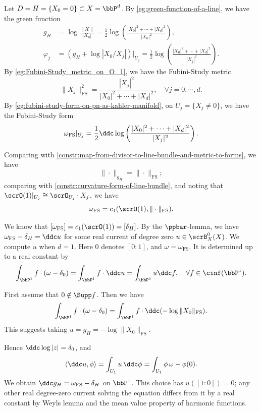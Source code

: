 \begin{example}[label=\labelNFM{eg:green-divisor-and-forms-of-line-in-pn}, status=draft, tag=0000000]
  Let $D = H = \{X_0 = 0\} \subset X = \bbP^d$.
  By \cref{eg:green-function-of-a-line}, we have the green function
  \begin{align*}
    g_H & = \log \frac{\|X\|}{|X_0|} = \frac{1}{2} \log \left( \frac{|X_0|^2 + \cdots + |X_d|^2}{|X_0|^2} \right), \\
    \varphi_j & = (g_H + \log |X_0/X_j|)|_{U_j} = \frac{1}{2} \log \left( \frac{|X_0|^2 + \cdots + |X_d|^2}{|X_j|^2} \right).
  \end{align*}
  By \cref{eg:Fubini-Study_metric_on_O_1}, we have the Fubini-Study metric
  \[ \|X_j\|_{\mathrm{FS}}^2 = \frac{|X_j|^2}{|X_0|^2 + \cdots + |X_d|^2}, \quad \forall j = 0,\cdots,d. \]
  By \cref{eg:fubini-study-form-on-pn-as-kahler-manifold}, on $U_j = \{X_j \neq 0\}$,
  we have the Fubini-Study form
  \[ \omega_{\mathrm{FS}}|_{U_j} = \frac{1}{2} \ddc \log \left(\frac{|X_0|^2 + \cdots + |X_d|^2}{|X_j|^2} \right). \]

  Comparing with \cref{constr:map-from-divisor-to-line-bundle-and-metric-to-forms}, we have
  \[ \|\cdot\|_{g_H} = \|\cdot\|_{\mathrm{FS}}; \]
  comparing with \cref{constr:curvature-form-of-line-bundle},
  and noting that $\scrO(1)|_{U_j} \cong \scrO_{U_j} \cdot X_j$, we have
  \[ \omega_{\mathrm{FS}} = c_1(\scrO(1), \|\cdot\|_{\mathrm{FS}}). \]

  We know that $[\omega_{\mathrm{FS}}] = c_1(\scrO(1)) = [\delta_H]$.
  By the $\ppbar$-lemma, we have $\omega_{\mathrm{FS}} - \delta_H = \ddc u$ for some real current of degree zero $u \in \scrB_X^0(X)$.
  We compute $u$ when $d = 1$.
  Here $0$ denotes $[0:1]$, and $\omega = \omega_{\mathrm{FS}}$.
  It is determined up to a real constant by
  \[ \int_{\bbP^1} f \cdot (\omega - \delta_0) = \int_{\bbP^1} f \cdot \ddc u = \int_{\bbP^1} u \ddc f, \quad \forall f \in \cinf(\bbP^1). \]

  First assume that $0 \notin \Supp f$.
  Then we have
  \[ \int_{\bbP^1} f \cdot (\omega - \delta_0) = \int_{\bbP^1} f \cdot \ddc (- \log \|X_0\|_{\mathrm{FS}}). \]
  This suggests taking $u = g_H = -\log \|X_0\|_{\mathrm{FS}}$.



  Hence $\ddc\log|z| = \delta_0$, and
  \[ \langle \ddc u,\phi\rangle = \int_{U_1} u\,\ddc\phi = \int_{U_1} \phi\,\omega - \phi(0). \]
  We obtain $\ddc g_H = \omega_{\mathrm{FS}} - \delta_H$ on $\bbP^1$.
  This choice has $u([1:0]) = 0$; any other real degree-zero current solving the equation differs from it by a real constant by Weyl\textquotesingle s lemma and the mean value property of harmonic functions.

\end{example}

